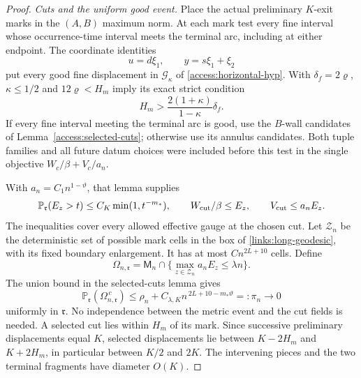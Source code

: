 \begin{proof}
\emph{Cuts and the uniform good event.}
Place the actual preliminary \(K\)-exit marks in the \((A,B)\) maximum
norm. At each mark test every fine interval whose occurrence-time
interval meets the terminal arc, including at either endpoint.
The coordinate identities
\[
 u=d\xi_1,\qquad y=s\xi_1+\xi_2
\]
put every good fine displacement in \(\mathcal G_\kappa\) of
\eqref{access:horizontal-hyp}. With \(\delta_f=2\varrho\),
\(\kappa\le1/2\) and \(12\varrho<H_m\) imply its exact strict
condition
\[
 H_m>\frac{2(1+\kappa)}{1-\kappa}\delta_f.
\]
If every fine interval meeting the terminal arc is good, use the
\(B\)-wall candidates of Lemma~\ref{access:selected-cuts}; otherwise
use its annulus candidates. Both tuple families and all future datum
choices were included before this test in the single objective
\(W_c/\beta+V_c/a_n\).

With \(a_n=C_1n^{1-\vartheta}\), that lemma supplies
\begin{equation}
 \mathbb P_{\mathfrak r}(E_z>t)\le C_K\min(1,t^{-m_*}),\qquad
 W_{\rm cut}/\beta\le E_z,\qquad V_{\rm cut}\le a_nE_z.
 \label{links:joint-cut-bound}
\end{equation}
The inequalities cover every allowed effective gauge at the chosen
cut. Let \(\mathcal Z_n\) be the deterministic set of possible mark
cells in the box of \eqref{links:long-geodesic}, with its fixed
boundary enlargement. It has at most \(Cn^{2L+10}\) cells. Define
\[
 \Omega_{n,\mathfrak r}
   =\mathsf M_n\cap\{\max_{z\in\mathcal Z_n}a_nE_z\le\lambda n\}.
\]
The union bound in the selected-cuts lemma gives
\[
 \mathbb P_{\mathfrak r}(\Omega_{n,\mathfrak r}^{\,c})
 \le \rho_n+C_{\lambda,K}n^{\,2L+10-m_*\vartheta}
 =:\pi_n\longrightarrow0
\]
uniformly in \(\mathfrak r\). No independence between the metric event
and the cut fields is needed. A selected cut lies within \(H_m\) of its
mark. Since successive preliminary displacements equal \(K\), selected
displacements lie between \(K-2H_m\) and \(K+2H_m\), in particular
between \(K/2\) and \(2K\). The intervening pieces and the two terminal
fragments have diameter \(O(K)\).


\end{proof}
